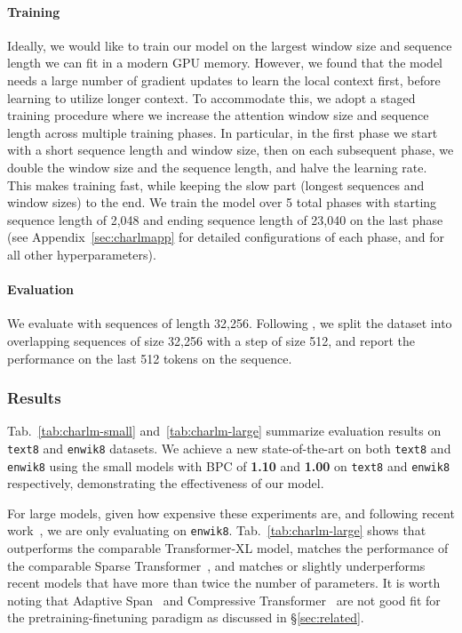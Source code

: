 \paragraph{Training}
Ideally, we would like to train our model on the largest window size and sequence length we can fit in a modern GPU memory. However, we found that 
the model needs a large number of gradient updates to learn the local context
first, before learning to utilize longer context. 
To accommodate this, we adopt a staged training procedure where we increase the attention window size and sequence length across multiple training phases. In particular, in the first phase we start with a short sequence length and window size, then on each subsequent phase, we double the window size and the sequence length, and halve the learning rate. 
This makes training fast, while keeping the slow part 
(longest sequences and window sizes) to the end. 
We train the model over 5 total phases with starting sequence length of 2,048 and ending sequence length of 23,040 
on the last phase (see Appendix~\ref{sec:charlmapp} for detailed configurations of each phase, and for all other hyperparameters).

\paragraph{Evaluation}
We evaluate with sequences of length 32,256.  Following \citet{transformerxl}, we split the dataset into overlapping sequences 
of size 32,256 with a step of size 512, and report the performance on the last 512 tokens on the sequence. 


\subsubsection{Results}
Tab.~\ref{tab:charlm-small} and~\ref{tab:charlm-large} summarize evaluation results on \texttt{text8} and \texttt{enwik8} datasets. 
We achieve a new state-of-the-art on both \texttt{text8} and \texttt{enwik8} using the small models with BPC of \textbf{1.10} and \textbf{1.00} on \texttt{text8} and \texttt{enwik8} respectively, demonstrating the effectiveness of our model.

For large models, given how expensive these experiments are, 
and following recent work~\cite{reformer,compressive}, 
we are only evaluating on \texttt{enwik8}. 
Tab.~\ref{tab:charlm-large} shows that \model
outperforms the comparable Transformer-XL model, 
matches the performance of the comparable Sparse Transformer~\cite{sparseOpenai},
and matches or slightly underperforms recent models 
that have more than twice the number of parameters.
It is worth noting that Adaptive Span~\cite{adaptivespan}
and Compressive Transformer~\cite{compressive}
are not good fit for the pretraining-finetuning paradigm as discussed in 
\S\ref{sec:related}.


